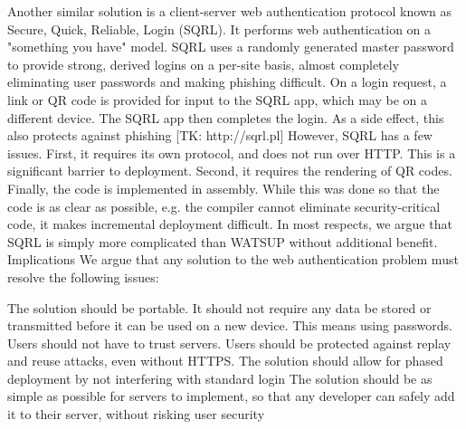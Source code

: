 Another similar solution is a client-server web authentication protocol known as Secure, Quick, Reliable, Login (SQRL). It performs web authentication on a "something you have" model. SQRL uses a randomly generated master password to provide strong, derived logins on a per-site basis, almost completely eliminating user passwords and making phishing difficult. On a login request, a link or QR code is provided for input to the SQRL app, which may be on a different device. The SQRL app then completes the login. As a side effect, this also protects against phishing [TK: http://sqrl.pl] However, SQRL has a few issues. First, it requires its own protocol, and does not run over HTTP. This is a significant barrier to deployment. Second, it requires the rendering of QR codes. Finally, the code is implemented in assembly. While this was done so that the code is as clear as possible, e.g. the compiler cannot eliminate security-critical code, it makes incremental deployment difficult. In most respects, we argue that SQRL is simply more complicated than WATSUP without additional benefit.
Implications
We argue that any solution to the web authentication problem must resolve the following issues:

The solution should be portable. It should not require any data be stored or transmitted before it can be used on a new device. This means using passwords.
Users should not have to trust servers.
Users should be protected against replay and reuse attacks, even without HTTPS.
The solution should allow for phased deployment by not interfering with standard login
The solution should be as simple as possible for servers to implement, so that any developer can safely add it to their server, without risking user security





